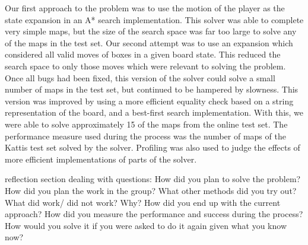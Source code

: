 \documentclass[a4paper,11pt]{article}
\begin{document}
Our first approach to the problem was to use the motion of the player as the
state expansion in an A* search implementation. This solver was able to complete
very simple maps, but the size of the search space was far too large to solve
any of the maps in the test set. Our second attempt was to use an expansion
which considered all valid moves of boxes in a given board state. This reduced
the search space to only those moves which were relevant to solving the
problem. Once all bugs had been fixed, this version of the solver could solve a
small number of maps in the test set, but continued to be hampered by
slowness. This version was improved by using a more efficient equality check
based on a string representation of the board, and a best-first search
implementation. With this, we were able to solve approximately 15 of the maps
from the online test set. The performance measure used during the process was
the number of maps of the Kattis test set solved by the solver. Profiling was
also used to judge the effects of more efficient implementations of parts of the
solver.

reflection section dealing with questions: How did you plan to solve the
problem? How did you plan the work in the group? What other methods did you try
out? What did work/ did not work? Why? How did you end up with the current
approach? How did you measure the performance and success during the process?
How would you solve it if you were asked to do it again given what you know now?

\printbibliography
\end{document}
